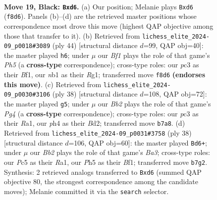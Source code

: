 \documentclass[11pt]{article}
\begin{document}
\clearpage

\begin{figure}[p]\centering
\begin{subfigure}{0.46\textwidth}\centering
\resizebox{\linewidth}{!}{%
\newchessgame
\chessboard[
  setfen={2rk1bnr/1b3pp1/pq1P4/2p3Pp/2Q2P1P/2P4R/PP6/RNB1K2B b Q - 0 19},
  showmover=false,
  pgfstyle=straightmove, color=movearrow, markmove={f8-d6}
]}
\caption{}
\end{subfigure}\hfill
\begin{subfigure}{0.46\textwidth}\centering
\resizebox{\linewidth}{!}{%
\newchessgame
\chessboard[
  setfen={r1b2rk1/pp4p1/1q1npb2/4Np1P/2pP1B2/2Q2P2/PP4R1/2K2BR1 w - - 1 23},
  showmover=false,
  pgfstyle=straightmove, color=movearrow, markmove={h5-h6}
]}
\caption{}
\end{subfigure}
\\[4pt]
\begin{subfigure}{0.46\textwidth}\centering
\resizebox{\linewidth}{!}{%
\newchessgame
\chessboard[
  setfen={r3k2r/1pbn1p1p/pq2p3/3p3p/P2P1PP1/2PB4/1P1BQ3/R4RK1 w kq - 0 20},
  showmover=false,
  pgfstyle=straightmove, color=movearrow, markmove={g4-g5}
]}
\caption{}
\end{subfigure}\hfill
\begin{subfigure}{0.46\textwidth}\centering
\resizebox{\linewidth}{!}{%
\newchessgame
\chessboard[
  setfen={1k1r2n1/pp1b1p1r/4p1pp/3pP3/P1pq1NQP/B4R2/2P2PP1/R3KB2 w Q - 0 20},
  showmover=false,
  pgfstyle=straightmove, color=movearrow, markmove={a3-d6}
]}
\caption{}
\end{subfigure}
\caption{\textbf{Move 19, Black: \texttt{Bxd6}.} (a) Our position; Melanie plays \texttt{Bxd6} (\texttt{f8d6}). Panels (b)--(d) are the retrieved master positions whose correspondence most drove this move (highest QAP objective among those that transfer to it). (b) Retrieved from \texttt{lichess\_elite\_2024-09\_p0018\#3089} (ply 44) [structural distance $d$=99, QAP obj=40]: the master played \texttt{h6}; under $\mu$ our \emph{Bf1} plays the role of that game's \emph{Ph5} (a \textbf{cross-type} correspondence); cross-type roles: our \emph{p}c3 as their \emph{B}f1, our \emph{n}b1 as their \emph{R}g1; transferred move \texttt{f8d6} \textbf{(endorses this move)}. (c) Retrieved from \texttt{lichess\_elite\_2024-09\_p0030\#3106} (ply 38) [structural distance $d$=108, QAP obj=72]: the master played \texttt{g5}; under $\mu$ our \emph{Bb2} plays the role of that game's \emph{Pg4} (a \textbf{cross-type} correspondence); cross-type roles: our \emph{p}c3 as their \emph{R}a1, our \emph{p}h4 as their \emph{B}d2; transferred move \texttt{b7a8}. (d) Retrieved from \texttt{lichess\_elite\_2024-09\_p0031\#3758} (ply 38) [structural distance $d$=106, QAP obj=60]: the master played \texttt{Bd6+}; under $\mu$ our \emph{Bb2} plays the role of that game's \emph{Ba3}; cross-type roles: our \emph{P}c5 as their \emph{R}a1, our \emph{P}h5 as their \emph{B}f1; transferred move \texttt{b7g2}. Synthesis: 2 retrieved analogs transferred to \texttt{Bxd6} (summed QAP objective 80, the strongest correspondence among the candidate moves); Melanie committed it via the \texttt{search} selector.}
\label{fig:thought-m37}
\end{figure}
\end{document}
